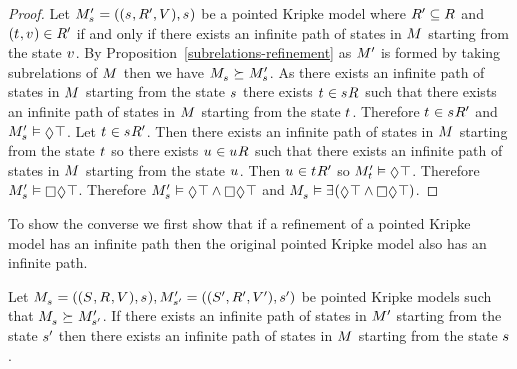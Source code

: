 \begin{proof}
Let $\kPModelP{\kStateS} = ((\kStateS, \kAccessibilityP{}, \kValuation), \kStateS)$ be a pointed Kripke model where $\kAccessibilityP{} \subseteq \kAccessibility{}$ and $(\kStateT, \kStateV) \in \kAccessibilityP{}$ if and only if there exists an infinite path of states in $\kModel$ starting from the state $\kStateV$.
By Proposition~\ref{subrelations-refinement} as ${M^{\prime}_{}}$ is formed by taking subrelations of $\kModel$ then we have $\kPModel{\kStateS} \simulates \kPModelP{\kStateS}$.
As there exists an infinite path of states in $\kModel$ starting from the state $\kStateS$ there exists $\kStateT \in \kSuccessors{}{\kStateS}$ such that there exists an infinite path of states in $\kModel$ starting from the state $\kStateT$.
Therefore $\kStateT \in \kSuccessorsP{}{\kStateS}$ and $\kPModelP{\kStateS} \entails \possible \top$.
Let $\kStateT \in \kSuccessorsP{}{\kStateS}$.
Then there exists an infinite path of states in $\kModel$ starting from the state $\kStateT$ so there exists $\kStateU \in \kSuccessors{}{\kStateU}$ such that there exists an infinite path of states in $\kModel$ starting from the state $\kStateU$.
Then $\kStateU \in \kSuccessorsP{}{\kStateT}$ so $\kPModelP{\kStateT} \entails \possible \top$.
Therefore $\kPModelP{\kStateS} \entails \necessary \possible \top$.
Therefore $\kPModelP{\kStateS} \entails \possible \top \land \necessary \possible \top$ and $\kPModel{\kStateS} \entails \somerefs (\possible \top \land \necessary \possible \top)$.
\end{proof}

To show the converse we first show that if a refinement of a pointed Kripke model has an infinite path then the original pointed Kripke model also has an infinite path.

\begin{lemma}\label{rml-k4-refinements-infinite-paths}
Let $\kPModelAndTuple{\kStateS}, \kPModelAndTupleP{\kStateSP}$ be pointed Kripke models such that $\kPModel{\kStateS} \simulates \kPModelP{\kStateSP}$.
If there exists an infinite path of states in ${M^{\prime}_{}}$ starting from the state ${s}^{\prime}$ then there exists an infinite path of states in $\kModel$ starting from the state $\kStateS$.
\end{lemma}
 
